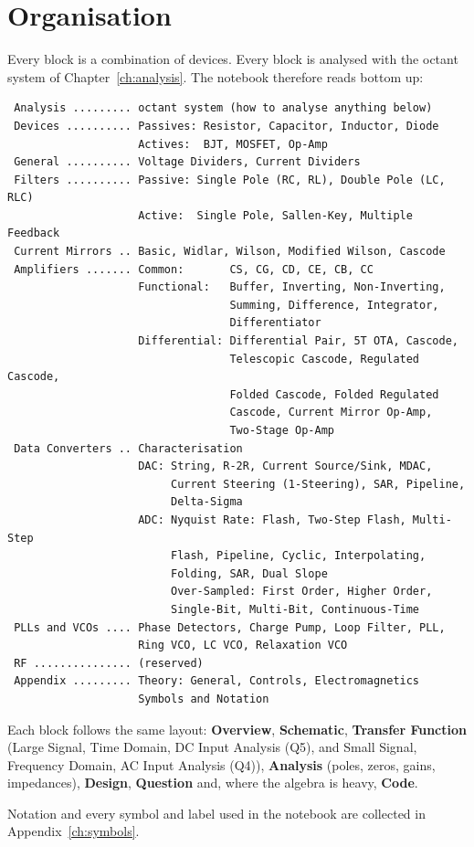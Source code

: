 \chapter*{Organisation}
Every block is a combination of devices. Every block is analysed with
the octant system of Chapter~\ref{ch:analysis}. The notebook therefore
reads bottom up:
\begin{verbatim}
 Analysis ......... octant system (how to analyse anything below)
 Devices .......... Passives: Resistor, Capacitor, Inductor, Diode
                    Actives:  BJT, MOSFET, Op-Amp
 General .......... Voltage Dividers, Current Dividers
 Filters .......... Passive: Single Pole (RC, RL), Double Pole (LC, RLC)
                    Active:  Single Pole, Sallen-Key, Multiple Feedback
 Current Mirrors .. Basic, Widlar, Wilson, Modified Wilson, Cascode
 Amplifiers ....... Common:       CS, CG, CD, CE, CB, CC
                    Functional:   Buffer, Inverting, Non-Inverting,
                                  Summing, Difference, Integrator,
                                  Differentiator
                    Differential: Differential Pair, 5T OTA, Cascode,
                                  Telescopic Cascode, Regulated Cascode,
                                  Folded Cascode, Folded Regulated
                                  Cascode, Current Mirror Op-Amp,
                                  Two-Stage Op-Amp
 Data Converters .. Characterisation
                    DAC: String, R-2R, Current Source/Sink, MDAC,
                         Current Steering (1-Steering), SAR, Pipeline,
                         Delta-Sigma
                    ADC: Nyquist Rate: Flash, Two-Step Flash, Multi-Step
                         Flash, Pipeline, Cyclic, Interpolating,
                         Folding, SAR, Dual Slope
                         Over-Sampled: First Order, Higher Order,
                         Single-Bit, Multi-Bit, Continuous-Time
 PLLs and VCOs .... Phase Detectors, Charge Pump, Loop Filter, PLL,
                    Ring VCO, LC VCO, Relaxation VCO
 RF ............... (reserved)
 Appendix ......... Theory: General, Controls, Electromagnetics
                    Symbols and Notation
\end{verbatim}
Each block follows the same layout: \textbf{Overview}, \textbf{Schematic},
\textbf{Transfer Function} (Large Signal, Time Domain, DC Input Analysis
(Q5), and Small Signal, Frequency Domain, AC Input Analysis (Q4)),
\textbf{Analysis} (poles, zeros, gains, impedances), \textbf{Design},
\textbf{Question} and, where the algebra is heavy, \textbf{Code}.

Notation and every symbol and label used in the notebook are collected
in Appendix~\ref{ch:symbols}.
